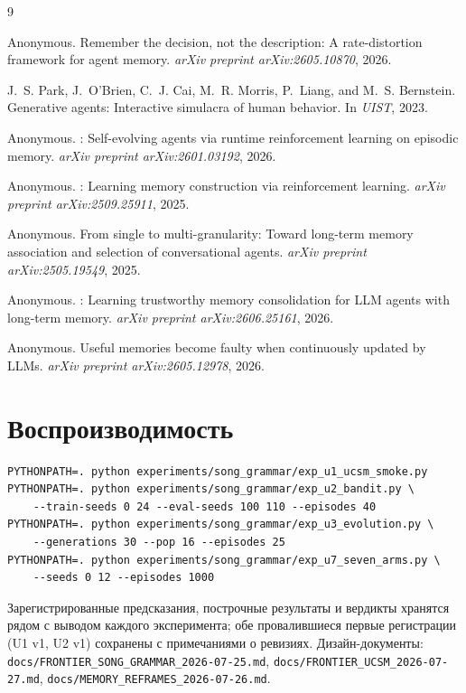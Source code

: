 \documentclass{article}
\begin{document}
\begin{thebibliography}{9}

Anonymous.
\newblock Remember the decision, not the description: A
rate-distortion framework for agent memory.
\newblock \emph{arXiv preprint arXiv:2605.10870}, 2026.

J.~S. Park, J.~O'Brien, C.~J. Cai, M.~R. Morris, P.~Liang, and
M.~S. Bernstein.
\newblock Generative agents: Interactive simulacra of human behavior.
\newblock In \emph{UIST}, 2023.

Anonymous.
: Self-evolving agents via runtime reinforcement
learning on episodic memory.
\newblock \emph{arXiv preprint arXiv:2601.03192}, 2026.

Anonymous.
: Learning memory construction via
reinforcement learning.
\newblock \emph{arXiv preprint arXiv:2509.25911}, 2025.

Anonymous.
\newblock From single to multi-granularity: Toward long-term memory
association and selection of conversational agents.
\newblock \emph{arXiv preprint arXiv:2505.19549}, 2025.

Anonymous.
: Learning trustworthy memory consolidation for
{LLM} agents with long-term memory.
\newblock \emph{arXiv preprint arXiv:2606.25161}, 2026.

Anonymous.
\newblock Useful memories become faulty when continuously updated by
{LLMs}.
\newblock \emph{arXiv preprint arXiv:2605.12978}, 2026.

\end{thebibliography}

\appendix

\section{Воспроизводимость}
\label{app:repro}
\begin{verbatim}
PYTHONPATH=. python experiments/song_grammar/exp_u1_ucsm_smoke.py
PYTHONPATH=. python experiments/song_grammar/exp_u2_bandit.py \
    --train-seeds 0 24 --eval-seeds 100 110 --episodes 40
PYTHONPATH=. python experiments/song_grammar/exp_u3_evolution.py \
    --generations 30 --pop 16 --episodes 25
PYTHONPATH=. python experiments/song_grammar/exp_u7_seven_arms.py \
    --seeds 0 12 --episodes 1000
\end{verbatim}
Зарегистрированные предсказания, построчные результаты и вердикты
хранятся рядом с выводом каждого эксперимента; обе провалившиеся
первые регистрации (U1 v1, U2 v1) сохранены с примечаниями о
ревизиях. Дизайн-документы:
\texttt{docs/FRONTIER\_SONG\_GRAMMAR\_2026-07-25.md},
\texttt{docs/FRONTIER\_UCSM\_2026-07-27.md},
\texttt{docs/MEMORY\_REFRAMES\_2026-07-26.md}.
\end{document}
